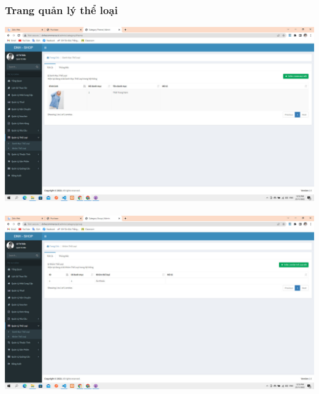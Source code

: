 \documentclass[12pt,a4paper,2sides]{report}
\begin{document}
\subsubsection{Trang quản lý thể loại}
    \includegraphics[width=1\linewidth]{lib/results/quanlytheloai.jpg}\\\vspace*{1cm}  
    \hspace{5cm}{Hình 48. Danh mục thể loại}\\
    \includegraphics[width=1\linewidth]{lib/results/quanlytheloai1.jpg}\\\vspace*{1cm} 
    \hspace{5cm}{Hình 49. Nhóm thể loại}\\
\end{document}
